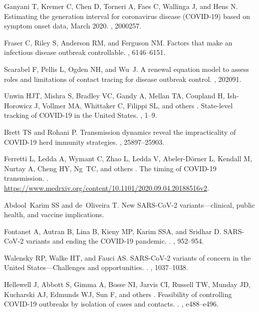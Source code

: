 \documentclass[12pt]{article}
\begin{document}
\begin{thebibliography}{10}
Ganyani T, Kremer C, Chen D, Torneri A, Faes C, Wallinga J, and Hens N.
 {Estimating the generation interval for coronavirus disease
  (COVID-19) based on symptom onset data, March 2020}.
, 2000257.

Fraser C, Riley S, Anderson RM, and Ferguson NM.
 Factors that make an infectious disease outbreak controllable.
, 6146--6151.

Scarabel F, Pellis L, Ogden NH, and Wu~J.
 A renewal equation model to assess roles and limitations of
  contact tracing for disease outbreak control.
, 202091.

Unwin HJT, Mishra S, Bradley VC, Gandy A, Mellan TA, Coupland H, Ish-Horowicz
  J, Vollmer MA, Whittaker C, Filippi SL, and others .
 {State-level tracking of COVID-19 in the United States}.
, 1--9.

Brett TS and Rohani P.
 Transmission dynamics reveal the impracticality of {COVID-19}
  herd immunity strategies.
, 25897--25903.

Ferretti L, Ledda A, Wymant C, Zhao L, Ledda V, Abeler-D{\"o}rner L, Kendall M,
  Nurtay A, Cheng HY, Ng~TC, and others .
 The timing of {COVID-19} transmission.
.
\newblock \url{https://www.medrxiv.org/content/10.1101/2020.09.04.20188516v2}.

Abdool~Karim SS and de~Oliveira T.
 {New SARS-CoV-2 variants—clinical, public health, and vaccine
  implications}.

Fontanet A, Autran B, Lina B, Kieny MP, Karim SSA, and Sridhar D.
 {SARS-CoV-2 variants and ending the COVID-19 pandemic}.
.
, 952--954.

Walensky RP, Walke HT, and Fauci AS.
 {SARS-CoV-2 variants of concern in the United
  States---Challenges and opportunities}.
.
, 1037--1038.

Hellewell J, Abbott S, Gimma A, Bosse NI, Jarvis CI, Russell TW, Munday JD,
  Kucharski AJ, Edmunds WJ, Sun F, and others .
 {Feasibility of controlling COVID-19 outbreaks by isolation of
  cases and contacts}.
.
, e488--e496.

\end{thebibliography}
\end{document}
